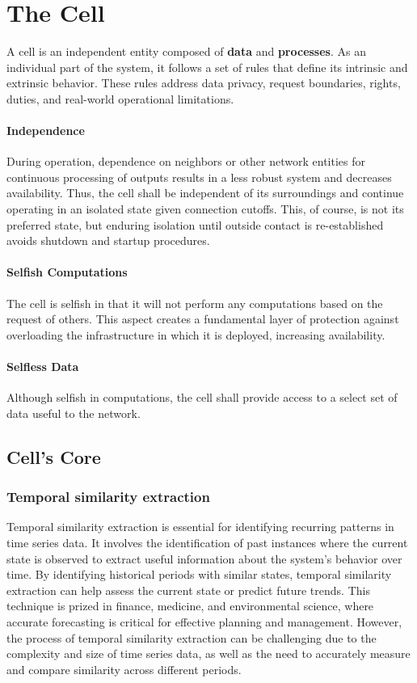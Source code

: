 \section{The Cell}

A cell is an independent entity composed of \textbf{data} and \textbf{processes}. As an individual part of the system, it follows a set of rules that define its intrinsic and extrinsic behavior. These rules address data privacy, request boundaries, rights, duties, and real-world operational limitations.

\paragraph*{Independence} During operation, dependence on neighbors or other network entities for continuous processing of outputs results in a less robust system and decreases availability. Thus, the cell shall be independent of its surroundings and continue operating in an isolated state given connection cutoffs. This, of course, is not its preferred state, but enduring isolation until outside contact is re-established avoids shutdown and startup procedures. 

\paragraph*{Selfish Computations} The cell is selfish in that it will not perform any computations based on the request of others. This aspect creates a fundamental layer of protection against overloading the infrastructure in which it is deployed, increasing availability.

\paragraph*{Selfless Data} Although selfish in computations, the cell shall provide access to a select set of data useful to the network.

\subsection{Cell's Core}

\subsubsection{Temporal similarity extraction}

Temporal similarity extraction is essential for identifying recurring patterns in time series data. It involves the identification of past instances where the current state is observed to extract useful information about the system's behavior over time. By identifying historical periods with similar states, temporal similarity extraction can help assess the current state or predict future trends. This technique is prized in finance, medicine, and environmental science, where accurate forecasting is critical for effective planning and management. However, the process of temporal similarity extraction can be challenging due to the complexity and size of time series data, as well as the need to accurately measure and compare similarity across different periods.

